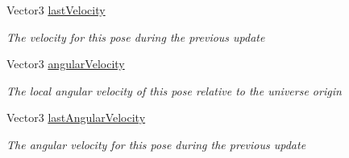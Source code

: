 \begin{DoxyCompactItemize}
Vector3 \mbox{\hyperlink{class_valve_1_1_v_r_1_1_steam_v_r___action___pose___source_a9924e517cd19760a503d0e6e46eec613}{last\+Velocity}}
\begin{DoxyCompactList}\small\item\em The velocity for this pose during the previous update \end{DoxyCompactList}\item 
Vector3 \mbox{\hyperlink{class_valve_1_1_v_r_1_1_steam_v_r___action___pose___source_aedacaebd65a9d294c1a54543b3115b5e}{angular\+Velocity}}
\begin{DoxyCompactList}\small\item\em The local angular velocity of this pose relative to the universe origin \end{DoxyCompactList}\item 
Vector3 \mbox{\hyperlink{class_valve_1_1_v_r_1_1_steam_v_r___action___pose___source_aad9297276978e92547f6631931ffaa54}{last\+Angular\+Velocity}}
\begin{DoxyCompactList}\small\item\em The angular velocity for this pose during the previous update \end{DoxyCompactList}\end{DoxyCompactItemize}
